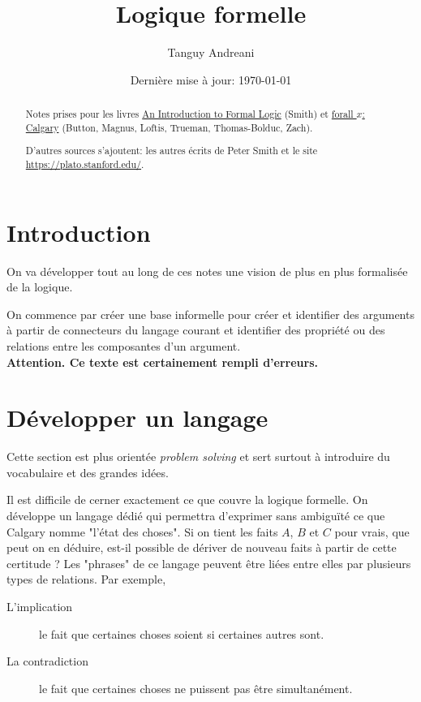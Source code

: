 \documentclass[fleqn,a4paper,nobib]{tufte-handout}
\title{Logique formelle}
\author{Tanguy Andreani}
\date{Dernière mise à jour: \today}
\begin{document}
\maketitle

\begin{abstract}
Notes prises pour les livres
\underline{An Introduction to Formal Logic} (Smith)
et \underline{forall $x$: Calgary} (Button, Magnus, Loftis, Trueman, Thomas-Bolduc, Zach).

D'autres sources s'ajoutent: les autres écrits de Peter Smith et le site
\url{https://plato.stanford.edu/}.
\end{abstract}

\tableofcontents

\section{Introduction}

On va développer tout au long de ces notes une vision de plus
en plus formalisée de la logique.

On commence par créer une base informelle pour créer et identifier
des arguments à partir de connecteurs du langage courant et identifier
des propriété ou des relations entre les composantes d'un argument.\\

\textbf{Attention. Ce texte est certainement rempli d'erreurs.}


\section{Développer un langage}

Cette section est plus orientée \textit{problem solving}
et sert surtout à introduire du vocabulaire et des grandes idées.

Il est difficile de cerner exactement ce que couvre la logique
formelle. On développe un langage dédié qui permettra d'exprimer
sans ambiguïté ce que Calgary nomme "l'état des choses". Si on tient
les faits $A$, $B$ et $C$ pour vrais, que peut on en déduire, est-il
possible de dériver de nouveau faits à partir de cette certitude ? Les
"phrases" de ce langage peuvent être liées entre elles par
plusieurs types de relations. Par exemple,

\begin{description}
    \item[L'implication] le fait que certaines choses soient si certaines autres sont.
    \item[La contradiction] le fait que certaines choses ne puissent pas être simultanément.
\end{description}
\end{document}

